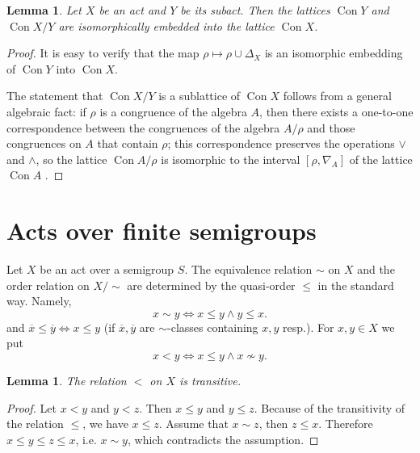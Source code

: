 \documentclass{birkau}
\numberwithin{equation}{section}
\theoremstyle{plain}
\newtheorem{lemma}[theorem]{Lemma}
\theoremstyle{definition}
\DeclareMathOperator{\Con}{Con}
\begin{document}
	\begin{lemma} \label{lemma:01}
	    Let $X$ be an act and $Y$ be its subact. Then the lattices $\Con Y$ and $\Con {X}/{Y}$ are isomorphically embedded into the lattice $\Con X$.
	\end{lemma}
	\begin{proof}
	    It is easy to verify that the map $\rho \mapsto \rho \cup \Delta_X$ is an isomorphic embedding of $\Con Y$ into $\Con X$.
		
	The statement that $\Con {X}/{Y}$ is a sublattice of $\Con X$ follows from a general algebraic fact: if $\rho$ is a congruence of the algebra $A$, then there exists a one-to-one correspondence between the congruences of the algebra ${A}/{\rho}$ and those congruences on $A$ that contain $\rho$; this correspondence preserves the operations $\vee$ and $\wedge$, so the lattice $\Con {A}/{\rho}$ is isomorphic to the interval $[\rho, \nabla_A]$ of the lattice $\Con A$ \cite[Theorem 6.20]{burris}.
    \end{proof}
	
	\section{Acts over finite semigroups}
	
	Let $X$ be an act over a semigroup $S$. The equivalence relation $\sim$ on $X$ and the order relation on $X/{\sim}$ are determined by the quasi-order $\leqslant$ in the standard way. Namely, $$ x \sim y \Leftrightarrow x \leqslant y \wedge y \leqslant x. $$ and $\overline{x} \leqslant \overline{y} \Leftrightarrow x \leqslant y $ (if $\overline{x}, \overline{y}$ are ${\sim}$-classes containing $x,y$ resp.).
	For $x,y \in X$ we put $$ x < y \Leftrightarrow x \leqslant y \wedge x \nsim y. $$
	
	\begin{lemma} \label{lemma:03}
	    The relation $<$ on $X$ is transitive.
	\end{lemma}
	\begin{proof}
	    Let $x < y$ and $y < z$. Then $x \leqslant y$ and $y \leqslant z$. Because of the transitivity of the relation $\leqslant$, we have $x \leqslant z$. Assume that $x \sim z$, then $z \leqslant x$. Therefore $x \leqslant y \leqslant z \leqslant x$, i.e. $x \sim y$, which contradicts the assumption.
	\end{proof}
	
\end{document}
